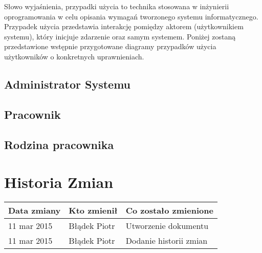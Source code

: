 Słowo wyjaśnienia, przypadki użycia to technika stosowana w inżynierii oprogramowania w celu opisania wymagań tworzonego systemu informatycznego. Przypadek użycia przedstawia interakcję pomiędzy aktorem (użytkownikiem systemu), który inicjuje zdarzenie oraz samym systemem.\newline
Poniżej zostaną przedstawione wstępnie przygotowane diagramy przypadków użycia użytkowników o konkretnych uprawnieniach.

\subsection{Administrator Systemu}
\subsection{Pracownik}
\subsection{Rodzina pracownika}

\section{Historia Zmian}

\begin{tabularx}{\textwidth}{X|l|X}
\hline
\textbf{Data zmiany} & \textbf{Kto zmienił} & \textbf{Co zostało zmienione} \\ \hline
11 mar 2015          & Błądek Piotr         & Utworzenie dokumentu          \\ \hline
11 mar 2015          &Błądek Piotr          &  Dodanie historii zmian            \\ \hline
\end{tabularx}